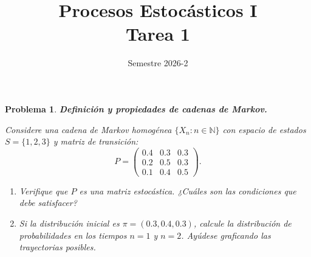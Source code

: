 \documentclass[12pt]{article}
\title{Procesos Estocásticos I \\ Tarea 1}
\author{Semestre 2026-2}
\date{}
\newtheorem{problem}{Problema}
\begin{document}
\maketitle

\begin{problem}
\textbf{Definición y propiedades de cadenas de Markov.}

Considere una cadena de Markov homogénea $\{X_n : n \in \mathbb{N}\}$ con espacio de estados $S = \{1, 2, 3\}$ y matriz de transición:
\[
P = \begin{pmatrix}
0.4 & 0.3 & 0.3 \\
0.2 & 0.5 & 0.3 \\
0.1 & 0.4 & 0.5
\end{pmatrix}.
\]

\begin{enumerate}
    \item[(a)] Verifique que $P$ es una matriz estocástica. ¿Cuáles son las condiciones que debe satisfacer?
    
    \item[(b)] Si la distribución inicial es $\pi = (0.3, 0.4, 0.3)$, calcule la distribución de probabilidades en los tiempos $n=1$ y $n=2$. Ayúdese graficando las trayectorias posibles.
    
\end{enumerate}
\end{problem}
\end{document}
